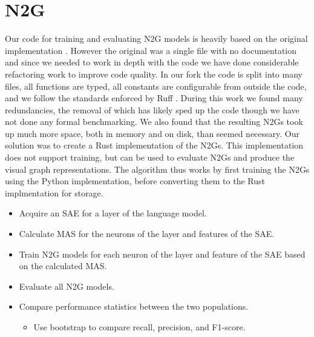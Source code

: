 \section{N2G}
Our code for training and evaluating N2G models is heavily based on the original implementation .
However the original was a single file with no documentation and since we needed to work in depth with the code we have done considerable refactoring work to improve code quality.
In our fork  the code is split into many files, all functions are typed, all constants are configurable from outside the code, and we follow the standards enforced by Ruff .
During this work we found many redundancies, the removal of which has likely sped up the code though we have not done any formal benchmarking.
We also found that the resulting N2Gs took up much more space, both in memory and on disk, than seemed necessary.
Our solution was to create a Rust implementation of the N2Gs.
This implementation does not support training, but can be used to evaluate N2Gs and produce the visual graph representations.
The algorithm thus works by first training the N2Gs using the Python implementation, before converting them to the Rust implmentation for storage.






\begin{itemize}
    \item Acquire an SAE for a layer of the language model.
    \item Calculate MAS for the neurons of the layer and features of the SAE.
    \item Train N2G models for each neuron of the layer and feature of the SAE based on the calculated MAS.
    \item Evaluate all N2G models.
    \item Compare performance statistics between the two populations.
    \begin{itemize}
        \item Use bootstrap to compare recall, precision, and F1-score.
    \end{itemize}
\end{itemize}

